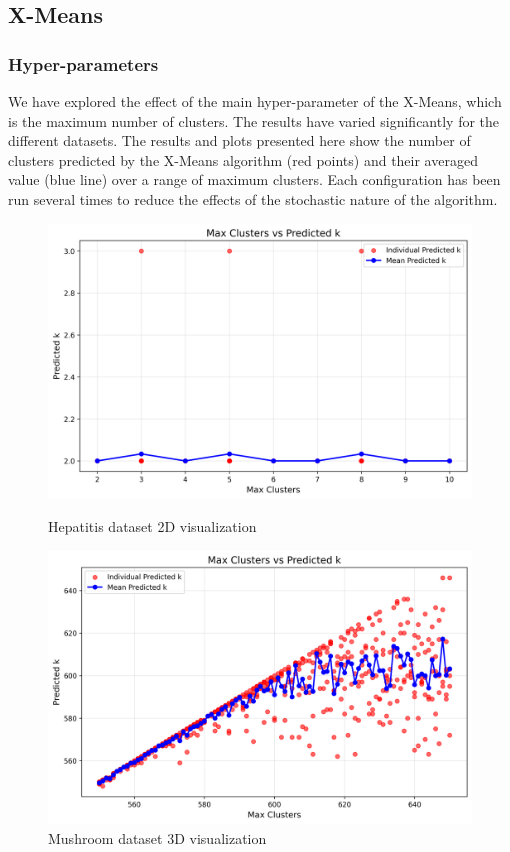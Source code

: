 \subsection{X-Means}
\subsubsection{Hyper-parameters}
We have explored the effect of the main hyper-parameter of the X-Means, which is the maximum number of clusters. The results have varied significantly for the different datasets. The results and plots presented here show the number of clusters predicted by the X-Means algorithm (red points) and their averaged value (blue line) over a range of maximum clusters. Each configuration has been run several times to reduce the effects of the stochastic nature of the algorithm.

\begin{figure}[H]
    \centering
    \begin{minipage}[b]{0.45\linewidth}
        \centering
        \includegraphics[width=\linewidth]{figures/XMeans/hepatitis_max_k_vs_predicted_k.png}
        \caption{Hepatitis dataset 2D visualization}
    \end{minipage}
    \hfill
    \begin{minipage}[b]{0.45\linewidth}
        \centering
        \includegraphics[width=\linewidth]{figures/XMeans/mushroom_max_k_vs_predicted_k.png}
        \caption{Mushroom dataset 3D visualization}
    \end{minipage}
\end{figure}

